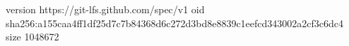version https://git-lfs.github.com/spec/v1
oid sha256:a155caa4ff1df25d7c7b84368d6c272d3bd8e8839c1eefcd343002a2cf3c6dc4
size 1048672
